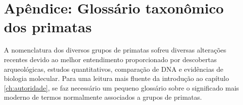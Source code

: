 \chapter{Apêndice: Glossário taxonômico dos primatas}
\label{ap:glossario}

A nomenclatura dos diversos grupos de primatas sofreu diversas alterações recentes devido ao melhor entendimento proporcionado por descobertas arqueológicas, estudos quantitativos, comparação de DNA e evidências de biologia molecular. Para uma leitura mais fluente da introdução ao capítulo \ref{ch:autoridade}, se faz necessário um pequeno glossário sobre o significado mais moderno de termos normalmente associados a grupos de primatas. 

